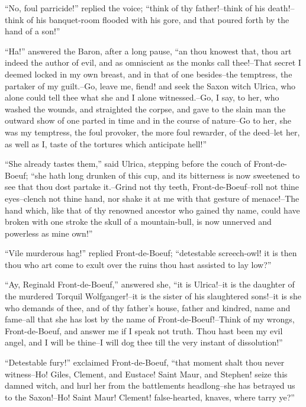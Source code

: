 ``No, foul parricide!'' replied the voice; ``think of thy father!--think
of his death!--think of his banquet-room flooded with his gore, and that
poured forth by the hand of a son!''

``Ha!'' answered the Baron, after a long pause, ``an thou knowest that,
thou art indeed the author of evil, and as omniscient as the monks call
thee!--That secret I deemed locked in my own breast, and in that of one
besides--the temptress, the partaker of my guilt.--Go, leave me, fiend!
and seek the Saxon witch Ulrica, who alone could tell thee what she and
I alone witnessed.--Go, I say, to her, who washed the wounds, and
straighted the corpse, and gave to the slain man the outward show of one
parted in time and in the course of nature--Go to her, she was my
temptress, the foul provoker, the more foul rewarder, of the deed--let
her, as well as I, taste of the tortures which anticipate hell!''

``She already tastes them,'' said Ulrica, stepping before the couch of
Front-de-Boeuf; ``she hath long drunken of this cup, and its bitterness
is now sweetened to see that thou dost partake it.--Grind not thy teeth,
Front-de-Boeuf--roll not thine eyes--clench not thine hand, nor shake it
at me with that gesture of menace!--The hand which, like that of thy
renowned ancestor who gained thy name, could have broken with one stroke
the skull of a mountain-bull, is now unnerved and powerless as mine
own!''

``Vile murderous hag!'' replied Front-de-Boeuf; ``detestable
screech-owl! it is then thou who art come to exult over the ruins thou
hast assisted to lay low?''

``Ay, Reginald Front-de-Boeuf,'' answered she, ``it is Ulrica!--it is
the daughter of the murdered Torquil Wolfganger!--it is the sister of
his slaughtered sons!--it is she who demands of thee, and of thy
father's house, father and kindred, name and fame--all that she has lost
by the name of Front-de-Boeuf!--Think of my wrongs, Front-de-Boeuf, and
answer me if I speak not truth. Thou hast been my evil angel, and I will
be thine--I will dog thee till the very instant of dissolution!''

``Detestable fury!'' exclaimed Front-de-Boeuf, ``that moment shalt thou
never witness--Ho! Giles, Clement, and Eustace! Saint Maur, and Stephen!
seize this damned witch, and hurl her from the battlements headlong--she
has betrayed us to the Saxon!--Ho! Saint Maur! Clement! false-hearted,
knaves, where tarry ye?''

